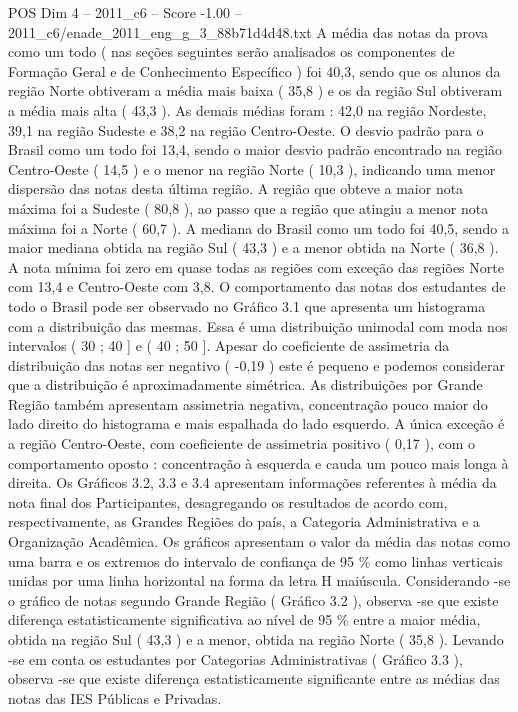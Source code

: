\begin{textsample}{POS Dim 4 – 2011\_c6 – Score -1.00 – 2011\_c6/enade\_2011\_eng\_g\_3\_88b71d4d48.txt}
A média das notas da prova como um todo ( nas seções seguintes serão analisados os componentes de Formação Geral e de Conhecimento Específico ) foi 40,3, sendo que os alunos da região Norte obtiveram a média mais baixa ( 35,8 ) e os da região Sul obtiveram a média mais alta ( 43,3 ).
As demais médias foram : 42,0 na região Nordeste, 39,1 na região Sudeste e 38,2 na região Centro-Oeste.
O desvio padrão para o Brasil como um todo foi 13,4, sendo o maior desvio padrão encontrado na região Centro-Oeste ( 14,5 ) e o menor na região Norte ( 10,3 ), indicando uma menor dispersão das notas desta última região.
A região que obteve a maior nota máxima foi a Sudeste ( 80,8 ), ao passo que a região que atingiu a menor nota máxima foi a Norte ( 60,7 ).
A mediana do Brasil como um todo foi 40,5, sendo a maior mediana obtida na região Sul ( 43,3 ) e a menor obtida na Norte ( 36,8 ).
A nota mínima foi zero em quase todas as regiões com exceção das regiões Norte com 13,4 e Centro-Oeste com 3,8.
O comportamento das notas dos estudantes de todo o Brasil pode ser observado no Gráfico 3.1 que apresenta um histograma com a distribuição das mesmas.
Essa é uma distribuição unimodal com moda nos intervalos ( 30 ; 40 ] e ( 40 ; 50 ].
Apesar do coeficiente de assimetria da distribuição das notas ser negativo ( -0,19 ) este é pequeno e podemos considerar que a distribuição é aproximadamente simétrica.
As distribuições por Grande Região também apresentam assimetria negativa, concentração pouco maior do lado direito do histograma e mais espalhada do lado esquerdo.
A única exceção é a região Centro-Oeste, com coeficiente de assimetria positivo ( 0,17 ), com o comportamento oposto : concentração à esquerda e cauda um pouco mais longa à direita.
Os Gráficos 3.2, 3.3 e 3.4 apresentam informações referentes à média da nota final dos Participantes, desagregando os resultados de acordo com, respectivamente, as Grandes Regiões do país, a Categoria Administrativa e a Organização Acadêmica.
Os gráficos apresentam o valor da média das notas como uma barra e os extremos do intervalo de confiança de 95 \% como linhas verticais unidas por uma linha horizontal na forma da letra H maiúscula.
Considerando -se o gráfico de notas segundo Grande Região ( Gráfico 3.2 ), observa -se que existe diferença estatisticamente significativa ao nível de 95 \% entre a maior média, obtida na região Sul ( 43,3 ) e a menor, obtida na região Norte ( 35,8 ).
Levando -se em conta os estudantes por Categorias Administrativas ( Gráfico 3.3 ), observa -se que existe diferença estatisticamente significante entre as médias das notas das IES Públicas e Privadas.

\end{textsample}
